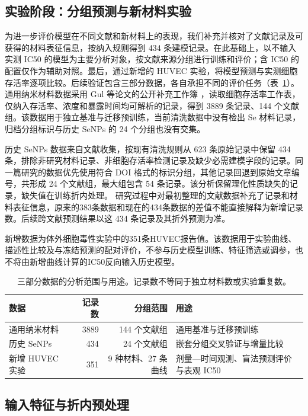 \documentclass[letterpaper]{article}
\begin{document}
\subsection{实验阶段：分组预测与新材料实验}

为进一步评价模型在不同文献和新材料上的表现，我们补充并核对了文献记录及可获得的材料表征信息，按纳入规则得到 434 条建模记录。在此基础上，以不输入实测 IC50 的模型为主要分析对象，按文献来源分组进行训练和评价；含 IC50 的配置仅作为辅助对照。最后，通过新增的 HUVEC 实验，将模型预测与实测细胞存活率逐项比较。后续验证包含三部分数据，各自承担不同的评价任务（表~\ref{tab:data_scope}）。通用纳米材料数据采用 Gul 等论文的公开补充工作簿 \cite{gul2021association}，读取细胞存活率工作表，仅纳入存活率、浓度和暴露时间均可解析的记录，得到 3889 条记录、144 个文献组。该数据用于独立基准与迁移预训练，当前清洗数据中没有检出 Se 材料记录，归档分组标识与历史 SeNPs 的 24 个分组也没有交集。

历史 SeNPs 数据来自文献收集，按现有清洗规则从 623 条原始记录中保留 434 条，排除非研究材料记录、非细胞存活率检测记录及缺少必需建模字段的记录。同一篇研究的数据优先使用符合 DOI 格式的标识分组，其他记录回退到原始文章编号，共形成 24 个文献组，最大组包含 54 条记录。该分析保留理化性质缺失的记录，缺失值在训练折内处理。
研究过程中对最初整理的文献数据补充了记录和材料表征信息，原来的383条数据和现在的434条数据的差值不能直接解释为新增记录数。后续跨文献预测结果以这 434 条记录及其折外预测为准。

新增数据为体外细胞毒性实验中的351条HUVEC报告值。该数据用于实验曲线、描述性比较及与冻结预测的配对评价，不参与历史模型训练、特征筛选或调参，也不将由新增曲线计算的IC50反向输入历史模型。

\begin{table}[H]
\centering
\caption{三部分数据的分析范围与用途。记录数不等同于独立材料数或实验重复数。}
\label{tab:data_scope}
\small
\begin{tabularx}{\linewidth}{lrrX}
\toprule
数据 & 记录数 & 分组范围 & 用途 \\
\midrule
通用纳米材料 & 3889 & 144 个文献组 & 通用基准与迁移预训练 \\
历史 SeNPs & 434 & 24 个文献组 & 嵌套分组交叉验证与增量比较 \\
新增 HUVEC 实验 & 351 & 9 种材料、27 条曲线 & 剂量—时间观测、盲法预测评价与表观 IC50 \\
\bottomrule
\end{tabularx}

\end{table}

\subsection{输入特征与折内预处理}
\end{document}
